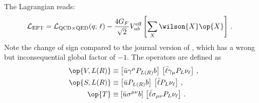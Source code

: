 The Lagrangian reads:
\begin{equation}
\begin{aligned}
  {\cal L}_{\rm EFT} &
  = {\cal L}_{{\rm QCD} \times {\rm QED}} (q;\, \ell) - \frac{4 G_F}{\sqrt{2}} V_{ub}^\text{eff} \left[
      \sum_{X}  \wilson{X} \op{X}
    \right] \,.
\end{aligned}
\end{equation}
Note the change of sign compared to the journal version of \cite{Feldmann:2015xsa}, which has a
wrong but inconsequential global factor of $-1$. The operators are defined as
\begin{equation}
\begin{aligned}
    \op{V,L(R)}
        & \equiv \left[\bar{u} \gamma^\mu P_{L(R)} b\right]\,\left[\bar{\ell} \gamma_\mu P_L \nu_\ell\right]\,, \\
    \op{S,L(R)}
        & \equiv \left[\bar{u} P_{L(R)} b\right]\,\left[\bar{\ell} P_L \nu_\ell\right]\,, \\
    \op{T}
        & \equiv \left[\bar{u} \sigma^{\mu\nu} b\right]\,\left[\bar{\ell} \sigma_{\mu\nu} P_L \nu_\ell\right]\,.
\end{aligned}
\end{equation}

